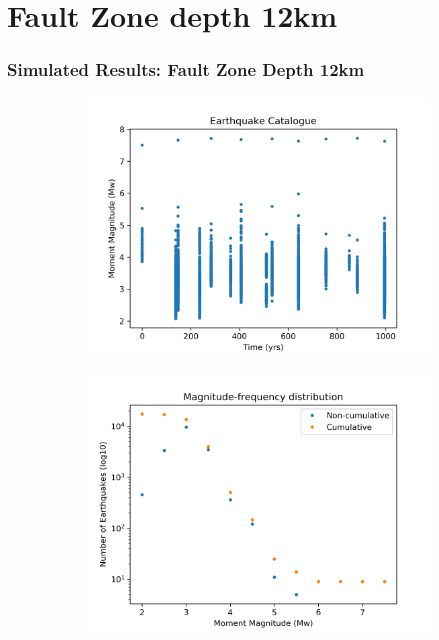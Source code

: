 \documentclass{beamer}
\begin{document}
\section{Fault Zone depth 12km}
\begin{frame}
    \frametitle{Simulated Results: Fault Zone Depth 12km}
    \begin{figure}
        \begin{subfigure}[b]{0.5\textwidth}
            \includegraphics[width=\textwidth]{images/result12km/catalogue} 
        \end{subfigure}%
        \begin{subfigure}[b]{0.5\textwidth}
            \includegraphics[width=\textwidth]{images/result12km/mfd}
        \end{subfigure}%
    \end{figure}

\end{frame}
\end{document}
